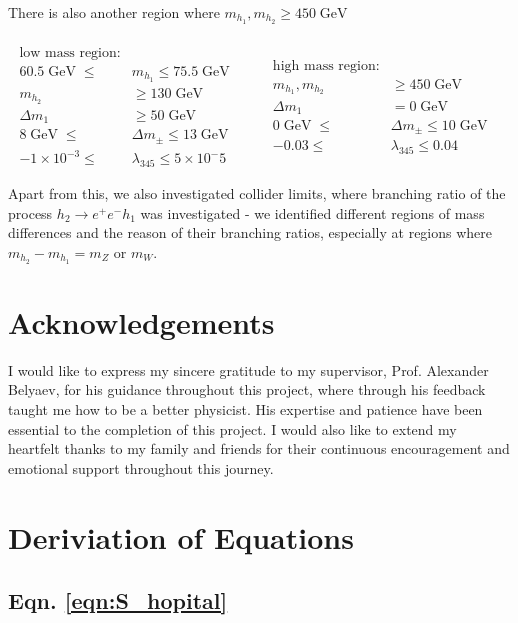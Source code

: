 \documentclass[12pt]{article}
\newcommand{\gev}{\mathrel{\text{ GeV}}}
\newcommand{\gevs}{\mathrel{\text{ GeV }}}
\newcommand{\mhone}{m_{h_1}}
\newcommand{\mhtwo}{m_{h_2}}
\begin{document}
There is also another region where $\mhone, \mhtwo \geq 450 \gev$

\begin{equation}
    {
        \begin{split}
            \\ \text{low mass region:}& 
            \\ 60.5 \gevs \leq &\mhone \leq 75.5 \gevs
            \\  \mhtwo &\geq 130 \gev 
            \\  \Delta m_1 & \geq 50 \gev
            \\ 8 \gevs\leq &\Delta m_\pm \leq 13\gev
            \\ -1 \times 10 ^{-3}\leq &\lambda_{345} \leq 5 \times 10^-5
        \end{split}
        }
        \qquad
    {
        \begin{split}
            \\ \text{high mass region:}&
            \\   \mhone, \mhtwo &\geq 450 \gev
            \\   \Delta m_1 & = 0 \gev
            \\0 \gevs\leq &\Delta m_\pm \leq 10\gev
            \\ -0.03 \leq &\lambda_{345} \leq 0.04
        \end{split}
    \text{ }}
\end{equation}

Apart from this, we also investigated collider limits, where branching ratio of the process $h_2\rightarrow e^+e^-h_1$ was investigated - we identified different regions of mass differences and the reason of their branching ratios, especially at regions where $\mhtwo - \mhone = m_Z$ or $m_W$.


\section{Acknowledgements}
I would like to express my sincere gratitude to my supervisor, Prof. Alexander Belyaev, for his guidance throughout this project, where through his feedback taught me how to be a better physicist. His expertise and patience have been essential to the completion of this project. I would also like to extend my heartfelt thanks to my family and friends for their continuous encouragement and emotional support throughout this journey.
\onecolumn
\newpage

 

\appendix
\section{Deriviation of Equations}
\subsection{Eqn. \ref{eqn:S_hopital}}
\end{document}
